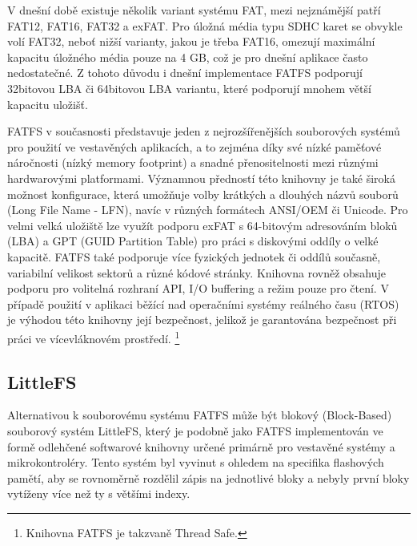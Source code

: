 V dnešní době existuje několik variant systému FAT, mezi nejznámější patří FAT12, FAT16, FAT32 a exFAT. Pro úložná média typu SDHC karet se obvykle volí FAT32, neboť nižší varianty, jakou je třeba FAT16, omezují maximální kapacitu úložného média pouze na 4 GB, což je pro dnešní aplikace často nedostatečné. Z tohoto důvodu i dnešní implementace FATFS podporují 32bitovou LBA či 64bitovou LBA variantu, které podporují mnohem větší kapacitu uložišť. \cite{elm_fat_filesystem_app_note}

FATFS v současnosti představuje jeden z nejrozšířenějších souborových systémů pro použití ve vestavěných aplikacích, a to zejména díky své nízké paměťové náročnosti (nízký memory footprint) a snadné přenositelnosti mezi různými hardwarovými platformami. Významnou předností této knihovny je také široká možnost konfigurace, která umožňuje volby krátkých a dlouhých názvů souborů (Long File Name - LFN), navíc v různých formátech ANSI/OEM či Unicode. Pro velmi velká uložiště lze využít podporu exFAT s 64-bitovým adresováním bloků (LBA) a GPT (GUID Partition Table) pro práci s diskovými oddíly o velké kapacitě. FATFS také podporuje více fyzických jednotek či oddílů současně, variabilní velikost sektorů a různé kódové stránky. Knihovna rovněž obsahuje podporu pro volitelná rozhraní API, I/O buffering a režim pouze pro čtení. V případě použití v aplikaci běžící nad operačními systémy reálného času (RTOS) je výhodou této knihovny její bezpečnost, jelikož je garantována bezpečnost při práci ve vícevláknovém prostředí. \footnote{Knihovna FATFS je takzvaně Thread Safe.} \cite{elm_fat_filesystem_module}


\subsection{LittleFS}
Alternativou k souborovému systému FATFS může být blokový (Block-Based) souborový systém LittleFS, který je podobně jako FATFS implementován ve formě odlehčené softwarové knihovny určené primárně pro vestavěné systémy a mikrokontroléry.  Tento systém byl vyvinut s ohledem na specifika flashových pamětí, aby se rovnoměrně rozdělil zápis na jednotlivé bloky a nebyly první bloky vytíženy více než ty s většími indexy.

